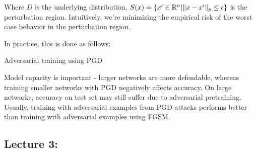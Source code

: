 \documentclass[11pt]{article}
\begin{document}
Where $D$ is the underlying distribution, $S(x) = \{x' \in \mathbb{R}^n | \lVert x - x' \rVert_p \leq \epsilon \}$ is the perturbation region. Intuitively, we're minimizing the empirical risk of the worst case behavior in the perturbation region.

In practice, this is done as follows:

\begin{algorithm}
\caption{Adversarial training using PGD}
\end{algorithm}

Model capacity is important - larger networks are more defendable, whereas training smaller networks with PGD negatively affects accuracy. On large networks, accuracy on test set may still suffer due to adversarial pretraining. Usually, training with adversarial examples from PGD attacks performs better than training with adversarial examples using FGSM.

\newpage
\subsection{Lecture 3: }

\newpage
\printbibliography
\end{document}
